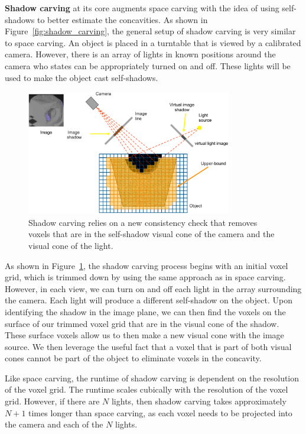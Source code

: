 \documentclass[a4paper, 12pt]{article}
\renewcommand\emph{\textbf}
\numberwithin{equation}{section}
\begin{document}
\emph{Shadow carving} at its core augments space carving with the idea of using self-shadows to better estimate the concavities. As shown in Figure~\ref{fig:shadow_carving}, the general setup of shadow carving is very similar to space carving. An object is placed in a turntable that is viewed by a calibrated camera. However, there is an array of lights in known positions around the camera who states can be appropriately turned on and off. These lights will be used to make the object cast self-shadows.

\begin{figure}[h!]
    \centering
    \includegraphics[width = 0.8\textwidth]{figures/shadow_carving_detailed.png}
    \caption{Shadow carving relies on a new consistency check that removes voxels that are in the self-shadow visual cone of the camera and the visual cone of the light.}
    \label{fig:shadow_carving_detailed}
\end{figure}

As shown in Figure~\ref{fig:shadow_carving_detailed}, the shadow carving process begins with an initial voxel grid, which is trimmed down by using the same approach as in space carving. However, in each view, we can turn on and off each light in the array surrounding the camera. Each light will produce a different self-shadow on the object. Upon identifying the shadow in the image plane, we can then find the voxels on the surface of our trimmed voxel grid that are in the visual cone of the shadow. These surface voxels allow us to then make a new visual cone with the image source. We then leverage the useful fact that a voxel that is part of both visual cones cannot be part of the object to eliminate voxels in the concavity. 

Like space carving, the runtime of shadow carving is dependent on the resolution of the voxel grid. The runtime scales cubically with the resolution of the voxel grid. However, if there are $N$ lights, then shadow carving takes approximately $N+1$ times longer than space carving, as each voxel needs to be projected into the camera and each of the $N$ lights.
\end{document}
